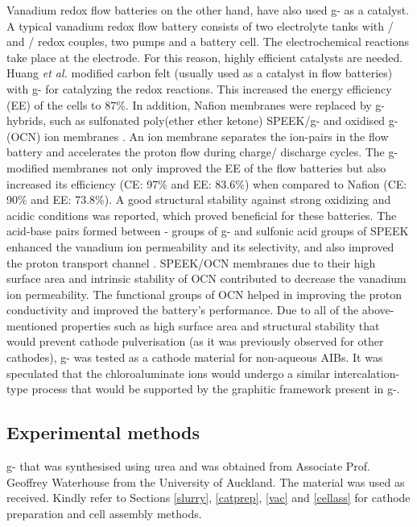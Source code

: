 Vanadium redox flow batteries on the other hand, have also used g- as a catalyst. A typical vanadium redox flow battery consists of two electrolyte tanks with / and / redox couples, two pumps and a battery cell. The electrochemical reactions take place at the electrode. For this reason, highly efficient catalysts are needed. Huang \textit{et al.} modified carbon felt (usually used as a catalyst in flow batteries) with g- for catalyzing the redox reactions. This increased the energy efficiency (EE) of the cells to 87\%. In addition, Nafion membranes were replaced by g- hybrids, such as sulfonated poly(ether ether ketone) SPEEK/g- and oxidised g- (OCN) ion membranes \cite{niu_novel_2017, wang_novel_2017}. An ion membrane separates the ion-pairs in the flow battery and accelerates the proton flow during charge/ discharge cycles. The g- modified membranes not only improved the EE of the flow batteries but also increased its efficiency (CE: 97\% and EE: 83.6\%) when compared to Nafion (CE: 90\% and EE: 73.8\%). A good structural stability against strong oxidizing and acidic conditions was reported, which proved beneficial for these batteries. The acid-base pairs formed between - groups of g- and sulfonic acid groups of SPEEK enhanced the vanadium ion permeability and its selectivity, and also improved the proton transport channel \cite{wang_novel_2017}. SPEEK/OCN membranes due to their high surface area and intrinsic stability of OCN contributed to decrease the vanadium ion permeability. The functional groups of OCN helped in improving the proton conductivity and improved the battery's performance. Due to all of the above-mentioned properties such as high surface area and structural stability that would prevent cathode pulverisation (as it was previously observed for other cathodes), g- was tested as a cathode material for non-aqueous AIBs. It was speculated that the chloroaluminate ions would undergo a similar intercalation-type process that would be supported by the graphitic framework present in g-.

\subsection{Experimental methods}
g- that was synthesised using urea and was obtained from Associate Prof. Geoffrey Waterhouse from the University of Auckland. The material was used as received.  Kindly refer to Sections \ref{slurry}, \ref{catprep}, \ref{vac} and \ref{cellass} for cathode preparation and cell assembly methods. 

